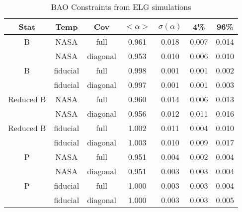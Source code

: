 \begin{table}
\caption{‌BAO Constraints from ELG simulations}
\begin{center}
\begin{tabular}{ccccccc}
Stat & Temp & Cov &$< \alpha >$ & $\sigma(\alpha) $ & 4\%&96\%\\
\hline
                            B  &       NASA & full & 0.961 & 0.018& 0.007 & 0.014\\ 
 &       NASA & diagonal & 0.953 & 0.010 &0.006 &0.010\\ 
\hline
                            B  &   fiducial & full & 0.998 & 0.001& 0.001 & 0.002\\ 
 &   fiducial & diagonal & 0.997 & 0.001 &0.001 &0.003\\ 
\hline
                    Reduced B  &       NASA & full & 0.960 & 0.014& 0.006 & 0.013\\ 
 &       NASA & diagonal & 0.956 & 0.012 &0.011 &0.016\\ 
\hline
                    Reduced B  &   fiducial & full & 1.002 & 0.011& 0.004 & 0.010\\ 
 &   fiducial & diagonal & 1.003 & 0.010 &0.009 &0.017\\ 
\hline
                            P  &       NASA & full & 0.951 & 0.004& 0.002 & 0.004\\ 
 &       NASA & diagonal & 0.951 & 0.003 &0.003 &0.004\\ 
\hline
                            P  &   fiducial & full & 1.000 & 0.003& 0.003 & 0.004\\ 
 &   fiducial & diagonal & 1.000 & 0.003 &0.003 &0.005
\end{tabular}
\end{center}
\label{label:elg}
\end{table}


